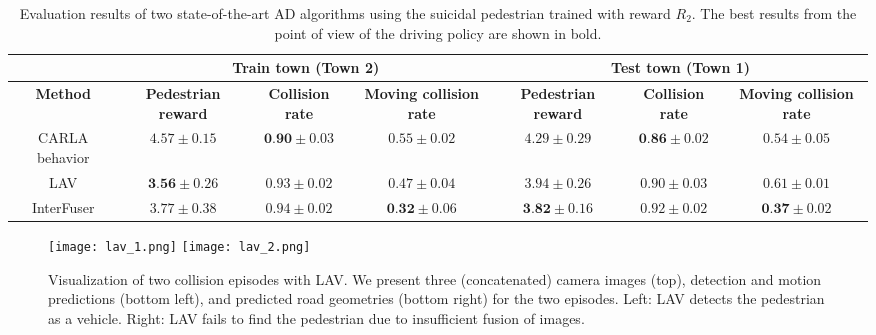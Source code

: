 \documentclass[letterpaper, 10 pt, conference]{ieeeconf}
\newcommand{\Rc}{R_2}
\begin{document}
\begin{table*}[tp]
    \caption{Evaluation results of two state-of-the-art AD algorithms using the suicidal pedestrian trained with reward $\Rc$.
    The best results from the point of view of the driving policy are shown in bold.}
    \centering
    \begin{tabular}{c|ccc|ccc}
        \hline
        & \multicolumn{3}{c}{\textbf{Train town (Town 2)}} & \multicolumn{3}{|c}{\textbf{Test town (Town 1)}} \\ \hline
        \textbf{Method} & \textbf{Pedestrian reward} & \textbf{Collision rate} & \textbf{Moving collision rate} & \textbf{Pedestrian reward} & \textbf{Collision rate} & \textbf{Moving collision rate} \\ \hline
        CARLA behavior & $4.57 \pm 0.15$ & $\textbf{0.90} \pm 0.03$ & $0.55 \pm 0.02$ & $4.29 \pm 0.29$ & $\textbf{0.86} \pm 0.02$ & $0.54 \pm 0.05$ \\ %
        LAV \cite{chen2022learningfromallvehicles} & $\textbf{3.56} \pm 0.26$ & $0.93 \pm 0.02$ & $0.47 \pm 0.04$ & $3.94 \pm 0.26$ & $0.90 \pm 0.03$ & $0.61 \pm 0.01$ \\
        InterFuser \cite{shao2023safetysafetyenhanced} & $3.77 \pm 0.38$ & $0.94 \pm 0.02$ & $\textbf{0.32} \pm 0.06$ & $\textbf{3.82} \pm 0.16$ & $0.92 \pm 0.02$ & $\textbf{0.37} \pm 0.02$ \\ 
        \hline
    \end{tabular}
    \label{tab:vehicle_test}
\end{table*}

\begin{figure*}[tp]
    \centering
    \texttt{[image: lav\_1.png]}
    \hfil
    \texttt{[image: lav\_2.png]}
    \caption{Visualization of two collision episodes with LAV. We present three (concatenated) camera images (top), detection and motion predictions (bottom left), and predicted road geometries (bottom right) for the two episodes. Left: LAV detects the pedestrian as a vehicle. Right: LAV fails to find the pedestrian due to insufficient fusion of images. 
    }
    \label{fig:LAV_error_visualization}
\end{figure*}
\end{document}
